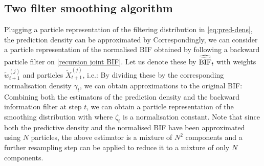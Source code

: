 \subsection{\label{introTFS}Two filter smoothing algorithm}
Plugging a particle representation of the filtering distribution in \eqref{eq:pred-dens}, the prediction density can be approximated by
%
%
Correspondingly, we can consider a particle representation of the normalised BIF obtained by following a backward particle filter on \eqref{recursion joint BIF}. 
Let us denote these by $\widehat{\widetilde{\text{BIF}}}_{t}$ with weights $\tilde w_{t+1}^{(j)}$ and particles $\tilde X^{(j)}_{t+1}$, i.e.:
%
%
By dividing these by the corresponding normalisation density $\gamma_{t}$, we can obtain approximations to the original BIF:
%
%
Combining both the estimators of the prediction density and the backward information filter at step $t$, we can obtain a particle representation of the smoothing distribution with
%
%
where $\zeta_{t}$ is a normalisation constant. 
Note that since both the predictive density and the normalised BIF have been approximated using $N$ particles, the above estimator is a mixture of $N^{2}$ components and a further resampling step can be applied to reduce it to a mixture of only $N$ components. 

